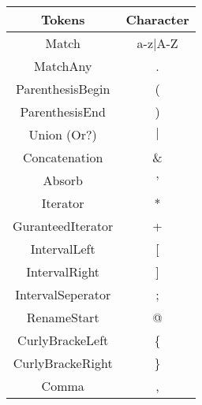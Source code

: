 \begin{tabular}{|c|c|}
    \hline
    \textbf{Tokens} & \textbf{Character}\\
    \hline
    Match & a-z$\mid$A-Z\\
    \hline
    MatchAny & .\\
    \hline
    ParenthesisBegin & (\\
    \hline
    ParenthesisEnd & )\\
    \hline
    Union (Or?) & $\mid$\\
    \hline
    Concatenation & \&\\
    \hline
    Absorb & '\\
    \hline
    Iterator & *\\
    \hline
    GuranteedIterator & +\\
    \hline
    IntervalLeft & [\\
    \hline
    IntervalRight & ]\\
    \hline
    IntervalSeperator & ;\\
    \hline
    RenameStart & @\\
    \hline
    CurlyBrackeLeft & \{\\
    \hline
    CurlyBrackeRight & \}\\
    \hline
    Comma & ,\\
    \hline
\end{tabular}